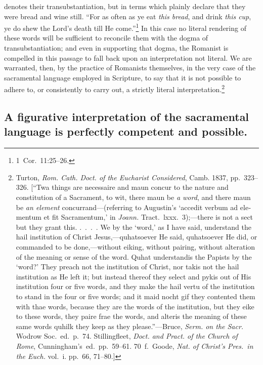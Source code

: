 \documentclass[
]{book}
\begin{document}
denotes their transubstantiation, but in terms which plainly declare that they were bread and wine still. ``For as often as ye eat \emph{this bread}, and drink \emph{this cup}, ye do shew the Lord's death till He come.''\footnote{1~Cor.~11:25--26.} In this case no literal rendering of these words will be sufficient to reconcile them with the dogma of transubstantiation; and even in supporting that dogma, the Romanist is compelled in this passage to fall back upon an interpretation not literal. We are warranted, then, by the practice of Romanists themselves, in the very case of the sacramental language employed in Scripture, to say that it is not possible to adhere to, or consistently to carry out, a strictly literal interpretation.\footnote{Turton, \emph{Rom. Cath. Doct. of the Eucharist Considered}, Camb. 1837, pp.~323--326. {[}``Twa things are necessaire and maun concur to the nature and constitution of a Sacrament, to wit, there maun be \emph{a word}, and there maun be \emph{an element} concurrand---(referring to Augustin's `\foreignlanguage{latin}{accedit verbum ad elementum et fit Sacramentum},' in \emph{Joann.} Tract.~lxxx.~3);---there is not a sect but they grant this. .~.~.~. We by the `word,' as I have said, understand the hail institution of Christ Jesus,---quhatsoever He said, quhatsoever He did, or commanded to be done,---without eiking, without pairing, without alteration of the meaning or sense of the word. Quhat understandis the Papists by the `word?' They preach not the institution of Christ, nor takis not the hail institution as He left it; but instead thereof they select and pykis out of His institution four or five words, and they make the hail vertu of the institution to stand in the four or five words; and it maid nocht gif they contented them with thae words, because they are the words of the institution, but they eike to these words, they paire frae the words, and alteris the meaning of these same words quhilk they keep as they please.''---Bruce, \emph{Serm. on the Sacr.} Wodrow Soc.~ed.~p.~74. Stillingfleet, \emph{Doct. and Pract. of the Church of Rome}, Cunningham's~ed.~pp.~59--61. 70~f.~Goode, \emph{Nat. of Christ's Pres.~in the Euch.} vol.~i. pp.~66, 71--80.{]}}

\hypertarget{a-figurative-interpretation-of-the-sacramental-language-is-perfectly-competent-and-possible.}{%
\subsection{A figurative interpretation of the sacramental language is perfectly competent and possible.}\label{a-figurative-interpretation-of-the-sacramental-language-is-perfectly-competent-and-possible.}}
\end{document}
